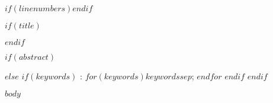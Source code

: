 \documentclass[$if(fontsize)$$fontsize$,$endif$$if(papersize)$$papersize$,$endif$$for(classoption)$$classoption$$sep$,$endfor$]{$documentclass$}
\begin{document}
\raggedright
$if(linenumbers)$\linenumbers$endif$

$if(title)$\maketitle\thispagestyle{empty}$endif$

$if(abstract)$
\begin{abstract}
\noindent $abstract$

$if(graphicalabstract)$
$endif$

$if(keywords)$
\vspace{0.5\baselineskip}
: $for(keywords)$$keywords$$sep$; $endfor$
$endif$
\end{abstract}
$else$
$if(keywords)$
: $for(keywords)$$keywords$$sep$; $endfor$
$endif$
$endif$

$body$
\end{document}
